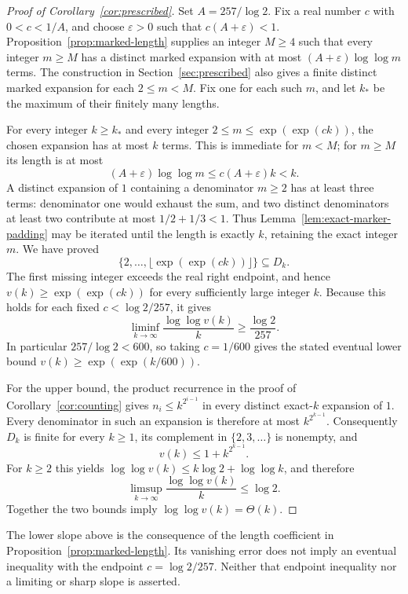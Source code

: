 \begin{proof}[Proof of Corollary~\ref{cor:prescribed}]
Set $A=257/\log2$. Fix a real number $c$ with $0<c<1/A$, and
choose $\varepsilon>0$ such that $c(A+\varepsilon)<1$.
Proposition~\ref{prop:marked-length} supplies an integer $M\ge4$ such
that every integer $m\ge M$ has a distinct marked expansion with
at most $(A+\varepsilon)\log\log m$ terms. The construction in
Section~\ref{sec:prescribed} also gives a finite distinct marked
expansion for each $2\le m<M$. Fix one for each such $m$, and let
$k_*$ be the maximum of their finitely many lengths.

For every integer $k\ge k_*$ and every integer
$2\le m\le\exp(\exp(ck))$, the chosen expansion has at most $k$
terms. This is immediate for $m<M$; for $m\ge M$ its length is at
most
\[
 (A+\varepsilon)\log\log m
 \le c(A+\varepsilon)k<k.
\]
A distinct expansion of $1$ containing a denominator $m\ge2$ has
at least three terms: denominator one would exhaust the sum, and two
distinct denominators at least two contribute at most $1/2+1/3<1$.
Thus Lemma~\ref{lem:exact-marker-padding} may be iterated until the
length is exactly $k$, retaining the exact integer $m$. We have proved
\[
 \{2,\ldots,\lfloor\exp(\exp(ck))\rfloor\}\subseteq D_k.
\]
The first missing integer exceeds the real right endpoint, and hence
$v(k)\ge\exp(\exp(ck))$ for every sufficiently large integer $k$.
Because this holds for each fixed $c<\log2/257$, it gives
\[
 \liminf_{k\to\infty}\frac{\log\log v(k)}{k}
 \ge\frac{\log2}{257}.
\]
In particular $257/\log2<600$, so taking $c=1/600$ gives the stated
eventual lower bound $v(k)\ge\exp(\exp(k/600))$.

For the upper bound, the product recurrence in the proof of
Corollary~\ref{cor:counting} gives $n_i\le k^{2^{i-1}}$ in every
distinct exact-$k$ expansion of $1$. Every denominator in such an
expansion is therefore at most $k^{2^{k-1}}$. Consequently $D_k$ is
finite for every $k\ge1$, its complement in $\{2,3,\ldots\}$ is
nonempty, and
\[
 v(k)\le1+k^{2^{k-1}}.
\]
For $k\ge2$ this yields
$\log\log v(k)\le k\log2+\log\log k$, and therefore
\[
 \limsup_{k\to\infty}\frac{\log\log v(k)}{k}\le\log2.
\]
Together the two bounds imply $\log\log v(k)=\Theta(k)$.
\end{proof}

The lower slope above is the consequence of the length coefficient
in Proposition~\ref{prop:marked-length}. Its vanishing error does not
imply an eventual inequality with the endpoint $c=\log2/257$.
Neither that endpoint inequality nor a limiting or sharp slope is
asserted.


